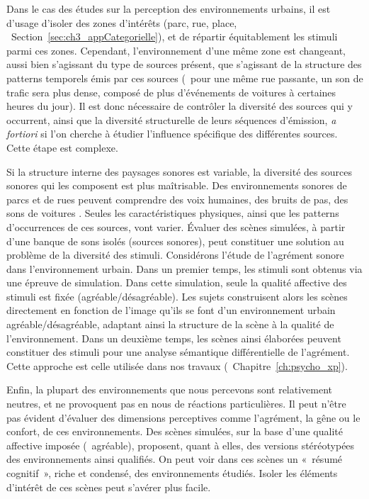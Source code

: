 \begin{itemize}
Dans le cas des études sur la perception des environnements urbains, il est d'usage d'isoler des zones d’intérêts (parc, rue, place, \cf~Section~\ref{sec:ch3_appCategorielle}), et de répartir équitablement les stimuli parmi ces zones. Cependant, l'environnement d'une même zone est changeant, aussi bien s'agissant du type de sources présent, que s'agissant de la structure des patterns temporels émis par ces sources (\eg~pour une même rue passante, un son de trafic sera plus dense, composé de plus d'événements de voitures à certaines heures du jour). Il est donc nécessaire de contrôler la diversité des sources qui y occurrent, ainsi que la diversité structurelle de leurs séquences d'émission, \emph{a fortiori} si l'on cherche à étudier l'influence spécifique des différentes sources. Cette étape est complexe. 

Si la structure interne des paysages sonores est variable, la diversité des sources sonores qui les composent est plus maîtrisable. Des environnements sonores de parcs et de rues peuvent comprendre des voix humaines, des bruits de pas, des sons de voitures \etc. Seules les caractéristiques physiques, ainsi que les patterns d'occurrences de ces sources, vont varier. Évaluer des scènes simulées, à partir d'une banque de sons isolés (sources sonores), peut constituer une solution au problème de la diversité des stimuli. Considérons l'étude de l'agrément sonore dans l'environnement urbain. Dans un premier temps, les stimuli sont obtenus via une épreuve de simulation. Dans cette simulation, seule la qualité affective des stimuli est fixée (agréable/désagréable). Les sujets construisent alors les scènes directement en fonction de l'image qu'ils se font d'un environnement urbain agréable/désagréable, adaptant ainsi la structure de la scène à la qualité de l'environnement. Dans un deuxième temps, les scènes ainsi élaborées peuvent constituer des stimuli pour une analyse sémantique différentielle de l'agrément. Cette approche est celle utilisée dans nos travaux (\cf~Chapitre~\ref{ch:psycho_xp}). 

Enfin, la plupart des environnements que nous percevons sont relativement neutres, et ne provoquent pas en nous de réactions particulières. Il peut n'être pas évident d'évaluer des dimensions perceptives comme l'agrément, la gêne ou le confort, de ces environnements. Des scènes simulées, sur la base d'une qualité affective imposée (\eg~agréable), proposent, quant à elles, des versions stéréotypées des environnements ainsi qualifiés. On peut voir dans ces scènes un «~résumé cognitif~», riche et condensé, des environnements étudiés. Isoler les éléments d'intérêt de ces scènes peut s'avérer plus facile.

\end{itemize}

